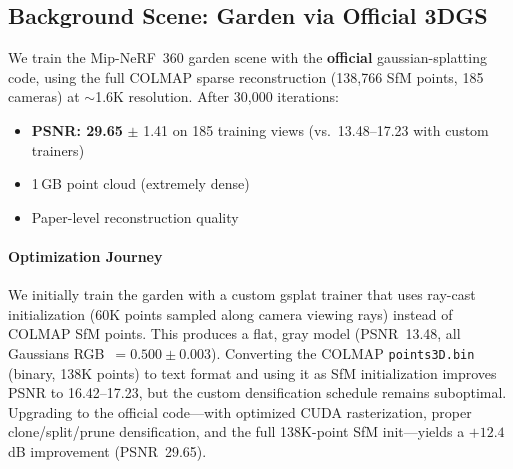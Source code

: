 \documentclass[10pt,twocolumn,letterpaper]{article}
\begin{document}
\begin{table}[h]
\centering
\caption{Object~C texture optimization metrics.}
\label{tab:objC_opt}
\end{table}

\subsection{Background Scene: Garden via Official 3DGS}

We train the Mip-NeRF~360 garden scene with the \textbf{official} gaussian-splatting code, using the full COLMAP sparse reconstruction (138{,}766 SfM points, 185 cameras) at $\sim$1.6K resolution. After 30{,}000 iterations:
\begin{itemize}
\item \textbf{PSNR: 29.65} $\pm$ 1.41 on 185 training views (vs.\ 13.48--17.23 with custom trainers)
\item 1\,GB point cloud (extremely dense)
\item Paper-level reconstruction quality
\end{itemize}

\paragraph{Optimization Journey} We initially train the garden with a custom gsplat trainer that uses ray-cast initialization (60K points sampled along camera viewing rays) instead of COLMAP SfM points. This produces a flat, gray model (PSNR~13.48, all Gaussians RGB~$= 0.500 \pm 0.003$). Converting the COLMAP \texttt{points3D.bin} (binary, 138K points) to text format and using it as SfM initialization improves PSNR to 16.42--17.23, but the custom densification schedule remains suboptimal. Upgrading to the official code---with optimized CUDA rasterization, proper clone/split/prune densification, and the full 138K-point SfM init---yields a $\boldsymbol{+12.4}$\,dB improvement (PSNR~29.65).
\end{document}
